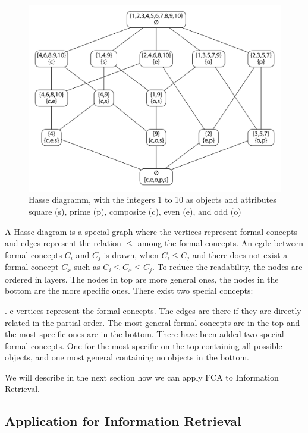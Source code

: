 \documentclass[11pt]{report}
\begin{document}
\begin{figure}[h]
\caption{Hasse diagramm, with the integers 1 to 10 as objects and attributes square (s), prime (p), composite (c), even (e), and odd (o)}
\label{figure:example}
	\centering
	\includegraphics[width=\linewidth]{fcaExample}
\end{figure}

A Hasse diagram is a special graph where the vertices represent formal concepts and edges represent the relation $\le$ among the formal concepts. An egde between formal concepts $C_i$ and $C_j$ is drawn, when $C_i \le C_j$ and there does not exist a formal concept $C_x$ such as $C_i \le C_x \le C_j$. To reduce the readability, the nodes are ordered in layers. The nodes in top are more general ones, the nodes in the bottom are the more specific ones. There exist two special concepts: 


. e vertices represent the formal concepts. The edges are there if they are directly related in the partial order. The most general formal concepts are in the top and the most specific ones are in the bottom. There have been added two special formal concepts. One for the most specific on the top containing all possible objects, and one most general containing no objects in the bottom. 

We will describe in the next section how we can apply FCA to Information Retrieval.




\subsection{Application for Information Retrieval}
\end{document}
